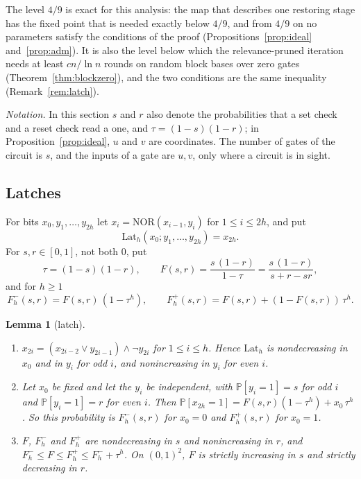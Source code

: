 \documentclass[11pt]{amsart}
\newtheorem{lemma}[theorem]{Lemma}
\theoremstyle{definition}
\theoremstyle{remark}
\newcommand{\NOR}{\mathrm{NOR}}
\newcommand{\PP}{\mathbb{P}}
\begin{document}
The level $4/9$ is exact for this analysis: the map that describes one restoring stage has the
fixed point that is needed exactly below $4/9$, and from $4/9$ on no parameters satisfy the
conditions of the proof (Propositions~\ref{prop:ideal} and~\ref{prop:adm}). It is also the level
below which the relevance-pruned iteration needs at least $cn/\ln n$ rounds on random block
bases over zero gates (Theorem~\ref{thm:blockzero}), and the two conditions are the same
inequality (Remark~\ref{rem:latch}).

\emph{Notation.} In this section $s$ and $r$ also denote the probabilities that a set check and a
reset check read a one, and $\tau=(1-s)(1-r)$; in Proposition~\ref{prop:ideal}, $u$ and $v$ are
coordinates. The number of gates of the circuit is $s$, and the inputs of a gate are $u,v$, only
where a circuit is in sight.

\subsection{Latches}

For bits $x_0,y_1,\dots,y_{2h}$ let $x_i=\NOR(x_{i-1},y_i)$ for $1\le i\le2h$, and put
\[
\mathrm{Lat}_h(x_0;y_1,\dots,y_{2h})=x_{2h}.
\]
For $s,r\in[0,1]$, not both $0$, put
\[
\tau=(1-s)(1-r),\qquad F(s,r)=\frac{s\,(1-r)}{1-\tau}=\frac{s\,(1-r)}{s+r-sr},
\]
and for $h\ge1$
\[
F^-_h(s,r)=F(s,r)\,(1-\tau^h),\qquad F^+_h(s,r)=F(s,r)+(1-F(s,r))\,\tau^h .
\]

\begin{lemma}[latch]\label{lem:latch}
\begin{enumerate}[label=(\alph*),leftmargin=2.4em]
\item $x_{2i}=(x_{2i-2}\vee y_{2i-1})\wedge\neg y_{2i}$ for $1\le i\le h$. Hence $\mathrm{Lat}_h$ is
nondecreasing in $x_0$ and in $y_i$ for odd $i$, and nonincreasing in $y_i$ for even $i$.
\item Let $x_0$ be fixed and let the $y_i$ be independent, with $\PP[y_i=1]=s$ for odd $i$ and
$\PP[y_i=1]=r$ for even $i$. Then $\PP[x_{2h}=1]=F(s,r)(1-\tau^h)+x_0\,\tau^h$. So this probability
is $F^-_h(s,r)$ for $x_0=0$ and $F^+_h(s,r)$ for $x_0=1$.
\item $F$, $F^-_h$ and $F^+_h$ are nondecreasing in $s$ and nonincreasing in $r$, and
$F^-_h\le F\le F^+_h\le F^-_h+\tau^h$. On $(0,1)^2$, $F$ is strictly increasing in $s$ and
strictly decreasing in $r$.
\end{enumerate}
\end{lemma}
\end{document}
